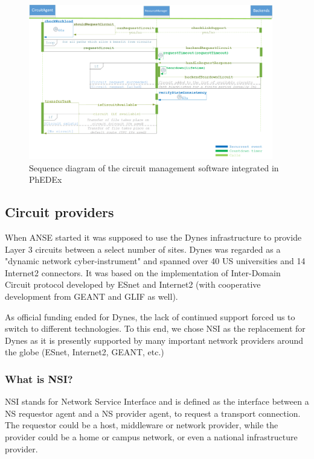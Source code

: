\begin{figure}[h]
  \centering
  \includegraphics[width=0.95\textwidth]{Figures/Circuit_framework-sequence_diagram.png}
  \caption{Sequence diagram of the circuit management software integrated in PhEDEx}
  \label{fig:sequence_diagram}
\end{figure} 

\subsection{Circuit providers}

When ANSE started it was supposed to use the Dynes infrastructure to provide Layer 3 circuits 
between a select number of sites. Dynes was regarded as a "dynamic network cyber-instrument"
and spanned over 40 US universities and 14 Internet2 connectors. It was based on the 
implementation of Inter-Domain Circuit protocol developed by ESnet and Internet2 (with 
cooperative development from GEANT and GLIF as well).

As official funding ended for Dynes, the lack of continued support forced us to switch to different 
technologies. To this end, we chose NSI as the replacement for Dynes as it is presently 
supported by many important network providers around the globe (ESnet, Internet2, GEANT, etc.)

\subsubsection{What is NSI?}

NSI stands for Network Service Interface and is defined as the interface between a
NS requestor agent and a NS provider agent, to request a transport connection.
The requestor could be a host, middleware or network provider, while the provider 
could be a home or campus network, or even a national infrastructure provider.

